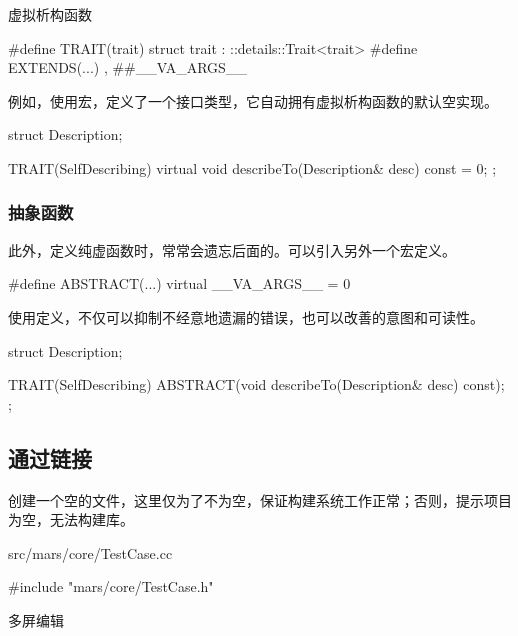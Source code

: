 \begin{content}
\begin{episode}{虚拟析构函数}
\begin{content}
\begin{c++}
#define TRAIT(trait)  struct trait : ::details::Trait<trait>
#define EXTENDS(...) , ##__VA_ARGS__
 \end{c++}

例如，使用宏，定义了一个接口类型，它自动拥有虚拟析构函数的默认空实现。

 \begin{c++}
struct Description;

TRAIT(SelfDescribing) {
  virtual void describeTo(Description& desc) const = 0;
};
 \end{c++}

\subsubsection{抽象函数}

此外，定义纯虚函数时，常常会遗忘后面的。可以引入另外一个宏定义。

 \begin{c++}
#define ABSTRACT(...) virtual __VA_ARGS__ = 0
 \end{c++}

使用定义，不仅可以抑制不经意地遗漏的错误，也可以改善的意图和可读性。

\begin{c++}
struct Description;

TRAIT(SelfDescribing) {
  ABSTRACT(void describeTo(Description& desc) const);
};
\end{c++}

\end{content}
\end{episode}

\subsection{通过链接}

创建一个空的文件，这里仅为了不为空，保证构建系统工作正常；否则，提示项目为空，无法构建库。

\begin{nodiff}{src/mars/core/TestCase.cc}
 \begin{c++}
#include "mars/core/TestCase.h"
 \end{c++}
\end{nodiff}

\begin{episode}{多屏编辑}


\end{episode}
\end{content}
